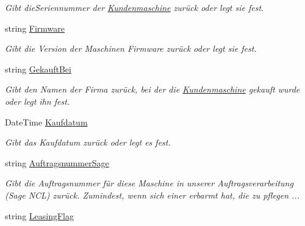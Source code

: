 \begin{DoxyCompactItemize}
\begin{DoxyCompactList}\small\item\em Gibt die\+Seriennummer der \hyperlink{class_products_1_1_model_1_1_entities_1_1_kundenmaschine}{Kundenmaschine} zurück oder legt sie fest. \end{DoxyCompactList}\item 
string \hyperlink{class_products_1_1_model_1_1_entities_1_1_kundenmaschine_a9f391606a9545d39e93fbc31da7973df}{Firmware}
\begin{DoxyCompactList}\small\item\em Gibt die Version der Maschinen Firmware zurück oder legt sie fest. \end{DoxyCompactList}\item 
string \hyperlink{class_products_1_1_model_1_1_entities_1_1_kundenmaschine_aa17f9f3ef307173a8f02ffb37120db81}{Gekauft\+Bei}
\begin{DoxyCompactList}\small\item\em Gibt den Namen der Firma zurück, bei der die \hyperlink{class_products_1_1_model_1_1_entities_1_1_kundenmaschine}{Kundenmaschine} gekauft wurde oder legt ihn fest. \end{DoxyCompactList}\item 
Date\+Time \hyperlink{class_products_1_1_model_1_1_entities_1_1_kundenmaschine_a66d88d6aa1856be3d9c59820c8e2bb21}{Kaufdatum}
\begin{DoxyCompactList}\small\item\em Gibt das Kaufdatum zurück oder legt es fest. \end{DoxyCompactList}\item 
string \hyperlink{class_products_1_1_model_1_1_entities_1_1_kundenmaschine_a551de60b37649f3d48e37befc3b57d84}{Auftragsnummer\+Sage}
\begin{DoxyCompactList}\small\item\em Gibt die Auftragsnummer für diese Maschine in unserer Auftragsverarbeitung (Sage N\+CL) zurück. Zumindest, wenn sich einer erbarmt hat, die zu pflegen ... \end{DoxyCompactList}\item 
string \hyperlink{class_products_1_1_model_1_1_entities_1_1_kundenmaschine_a83e54251e847c609fd48ab26f996c9cb}{Leasing\+Flag}

\end{DoxyCompactItemize}
